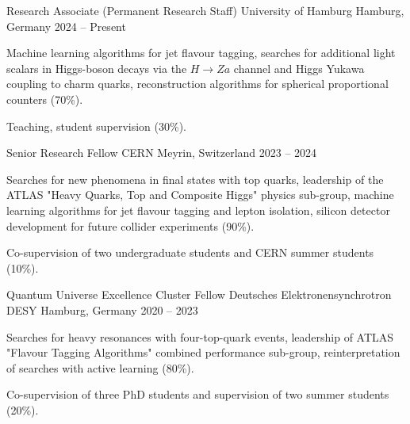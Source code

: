 \begin{cventries}

    \cventry
      {Research Associate (Permanent Research Staff)} %
      {University of Hamburg} %
      {Hamburg, Germany} %
      {2024 -- Present} %
      {
        \begin{cvitems} %
          \item {Machine learning algorithms for jet flavour tagging, searches for additional light scalars in Higgs-boson decays via the \(H \rightarrow Za\) channel and Higgs Yukawa coupling to charm quarks, reconstruction algorithms for spherical proportional counters (70\%).}
          \item {Teaching, student supervision (30\%).}
        \end{cvitems}
      }

    \cventry
      {Senior Research Fellow} %
      {CERN} %
      {Meyrin, Switzerland} %
      {2023 -- 2024} %
      {
        \begin{cvitems} %
          \item {Searches for new phenomena in final states with top quarks, leadership of the ATLAS "Heavy Quarks, Top and Composite Higgs" physics sub-group, machine learning algorithms for jet flavour tagging and lepton isolation, silicon detector development for future collider experiments (90\%).}
          \item {Co-supervision of two undergraduate students and CERN summer students (10\%).}
        \end{cvitems}
      }
  
    \cventry
      {Quantum Universe Excellence Cluster Fellow} %
      {Deutsches Elektronensynchrotron DESY} %
      {Hamburg, Germany} %
      {2020 -- 2023} %
      {
        \begin{cvitems} %
          \item {Searches for heavy resonances with four-top-quark events, leadership of ATLAS "Flavour Tagging Algorithms" combined performance sub-group, reinterpretation of searches with active learning (80\%). }
          \item {Co-supervision of three PhD students and supervision of two summer students (20\%).}
        \end{cvitems}
      }
  

\end{cventries}
